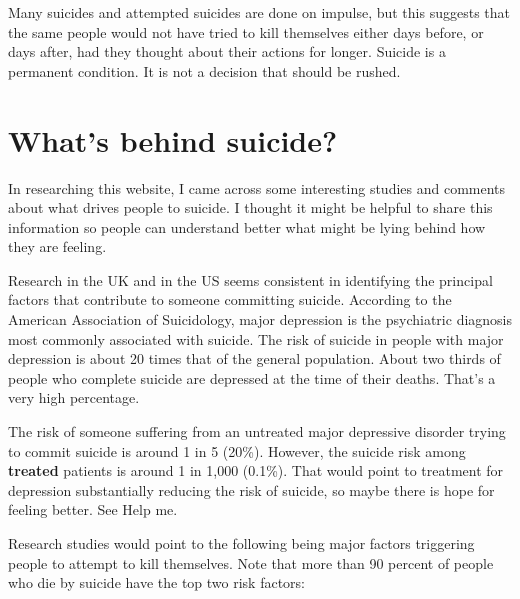 \documentclass[12pt]{article}
\begin{document}
Many suicides and attempted suicides are done on impulse, but this suggests that the same people would not have tried to kill themselves either days before, or days after, had they thought about their actions for longer. Suicide is a permanent condition. It is not a decision that should be rushed.

\section{What's behind suicide?}

In researching this website, I came across some interesting studies and comments about what drives people to suicide. I thought it might be helpful to share this information so people can understand better what might be lying behind how they are feeling.

Research in the UK and in the US seems consistent in identifying the principal factors that contribute to someone committing suicide. According to the American Association of Suicidology, major depression is the psychiatric diagnosis most commonly associated with suicide. The risk of suicide in people with major depression is about 20 times that of the general population. About two thirds of people who complete suicide are depressed at the time of their deaths. That's a very high percentage.

The risk of someone suffering from an untreated major depressive disorder trying to commit suicide is around 1 in 5 (20\%). However, the suicide risk among \textbf{treated} patients is around 1 in 1,000 (0.1\%). That would point to treatment for depression substantially reducing the risk of suicide, so maybe there is hope for feeling better. See Help me.

Research studies would point to the following being major factors triggering people to attempt to kill themselves. Note that more than 90 percent of people who die by suicide have the top two risk factors:
\end{document}
